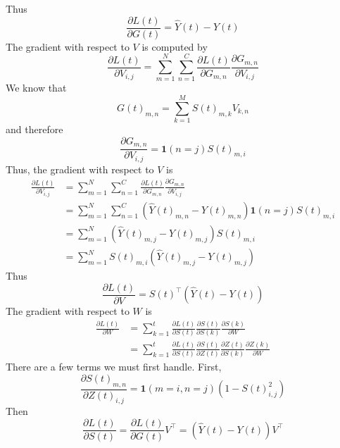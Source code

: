 \documentclass{article}
\begin{document}
Thus 
\begin{equation}
    \frac{\partial L(t)}{\partial G(t)} = \hat{Y}(t) - Y(t) 
\end{equation}
The gradient with respect to $V$ is computed by
\begin{equation}
    \frac{\partial L(t)}{\partial V_{i, j}} = \sum_{m=1}^N\sum_{n=1}^C \frac{\partial L(t)}{\partial G_{m, n}} \frac{\partial G_{m, n}}{\partial V_{i, j}}
\end{equation}
We know that 
\begin{equation}
    G(t)_{m, n} = \sum_{k=1}^M S(t)_{m, k}V_{k, n}
\end{equation}
and therefore
\begin{equation}
    \frac{\partial G_{m, n}}{\partial V_{i, j}} = \mathbf{1}(n = j)S(t)_{m, i}
\end{equation}
Thus, the gradient with respect to $V$ is 
\begin{align}
    \frac{\partial L(t)}{\partial V_{i, j}} 
    &= \sum_{m=1}^N\sum_{n=1}^C \frac{\partial L(t)}{\partial G_{m, n}} \frac{\partial G_{m, n}}{\partial V_{i, j}} \\
    &= \sum_{m=1}^N\sum_{n=1}^C (\hat{Y}(t)_{m, n} - Y(t)_{m, n}) \mathbf{1}(n = j)S(t)_{m, i} \\
    &= \sum_{m=1}^N (\hat{Y}(t)_{m, j} - Y(t)_{m, j}) S(t)_{m, i} \\
    &= \sum_{m=1}^N S(t)_{m, i}(\hat{Y}(t)_{m, j} - Y(t)_{m, j}) 
\end{align}
Thus 
\begin{equation}
    \frac{\partial L(t)}{\partial V} = S(t)^\top(\hat{Y}(t) - Y(t))
\end{equation}
The gradient with respect to $W$ is
\begin{align}
    \frac{\partial L(t)}{\partial W} 
    &= \sum_{k=1}^t 
    \frac{\partial L(t)}{\partial S(t)} 
    \frac{\partial S(t)}{\partial S(k)}
    \frac{\partial S(k)}{\partial W} \\
    &= \sum_{k=1}^t 
    \frac{\partial L(t)}{\partial S(t)}
    \frac{\partial S(t)}{\partial Z(t)}
    \frac{\partial Z(t)}{\partial S(k)}
    \frac{\partial Z(k)}{\partial W}
\end{align}
There are a few terms we must first handle. First,
\begin{equation}
    \frac{\partial S(t)_{m, n}}{\partial Z(t)_{i, j}} = \mathbf{1}(m=i, n=j)(1 - S(t)_{i, j}^2)
\end{equation}
Then 
\begin{equation}
    \frac{\partial L(t)}{\partial S(t)} = \frac{\partial L(t)}{\partial G(t)}V^\top = (\hat{Y}(t) - Y(t))V^\top
\end{equation}
\end{document}
